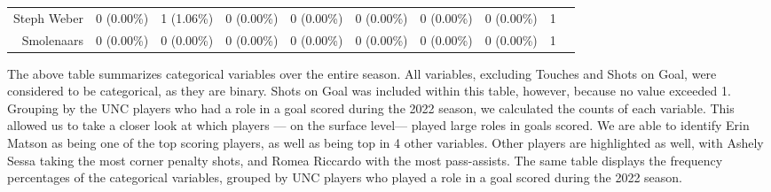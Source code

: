 \documentclass{article} %
\begin{document}
\begin{table}[ht]
{\begin{tabular}{rlrrrrrrrr}
		       Steph Weber & 0 (0.00\%)               &                1 (1.06\%) &                0 (0.00\%) &          0 (0.00\%) &                   0 (0.00\%) &                         0 (0.00\%) &              0 (0.00\%) &                   1 &  \\
		        Smolenaars & 0 (0.00\%)               &                0 (0.00\%) &                0 (0.00\%) &          0 (0.00\%) &                   0 (0.00\%) &                         0 (0.00\%) &              0 (0.00\%) &                   1 &  \\ \hline
	\end{tabular}}
\end{table}
\FloatBarrier


The above table summarizes categorical variables over the entire season. All variables, excluding Touches and Shots on Goal, were considered to be categorical, as they are binary. Shots on Goal was included within this table, however, because no value exceeded 1. Grouping by the UNC players who had a role in a goal scored during the 2022 season, we calculated the counts of each variable. This allowed us to take a closer look at which players --- on the surface level--- played large roles in goals scored. We are able to identify Erin Matson as being one of the top scoring players, as well as being top in 4 other variables. Other players are highlighted as well, with Ashely Sessa taking the most corner penalty shots, and Romea Riccardo with the most pass-assists. The same table displays the frequency percentages of the categorical variables, grouped by UNC players who played a role in a goal scored during the 2022 season. 
\end{document}
